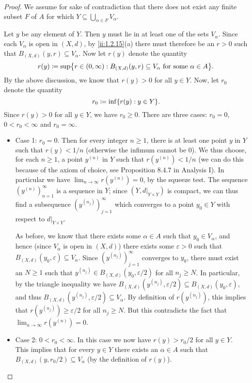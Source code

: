 \begin{proof}
  We assume for sake of contradiction that there does not exist any finite subset \(F\) of \(A\) for which \(Y \subseteq \bigcup_{\alpha \in F} V_{\alpha}\).

  Let \(y\) be any element of \(Y\).
  Then \(y\) must lie in at least one of the sets \(V_{\alpha}\).
  Since each \(V_{\alpha}\) is open in \((X, d)\), by \cref{ii:1.2.15}(a) there must therefore be an \(r > 0\) such that \(B_{(X, d)}(y, r) \subseteq V_{\alpha}\).
  Now let \(r(y)\) denote the quantity
  \[
    r(y) \coloneqq \sup\set{r \in (0, \infty) : B_{(X, d)}(y, r) \subseteq V_{\alpha} \text{ for some } \alpha \in A}.
  \]
  By the above discussion, we know that \(r(y) > 0\) for all \(y \in Y\).
  Now, let \(r_0\) denote the quantity
  \[
    r_0 \coloneqq \inf\set{r(y) : y \in Y}.
  \]
  Since \(r(y) > 0\) for all \(y \in Y\), we have \(r_0 \geq 0\).
  There are three cases: \(r_0 = 0\), \(0 < r_0 < \infty\) and \(r_0 = \infty\).
  \begin{itemize}
    \item Case 1:
          \(r_0 = 0\).
          Then for every integer \(n \geq 1\), there is at least one point \(y\) in \(Y\) such that \(r(y) < 1 / n\) (otherwise the infimum cannot be \(0\)).
          We thus choose, for each \(n \geq 1\), a point \(y^{(n)}\) in \(Y\) such that \(r(y^{(n)}) < 1 / n\)
          (we can do this because of the axiom of choice, see Proposition 8.4.7 in Analysis I).
          In particular we have \(\lim_{n \to \infty} r(y^{(n)}) = 0\), by the squeeze test.
          The sequence \((y^{(n)})_{n = 1}^\infty\) is a sequence in \(Y\);
          since \((Y, d|_{Y \times Y})\) is compact, we can thus find a subsequence \((y^{(n_j)})_{j = 1}^\infty\) which converges to a point \(y_0 \in Y\) with respect to \(d|_{Y \times Y}\).

          As before, we know that there exists some \(\alpha \in A\) such that \(y_0 \in V_{\alpha}\), and hence (since \(V_{\alpha}\) is open in \((X, d)\)) there exists some \(\varepsilon > 0\) such that \(B_{(X, d)}(y_0, \varepsilon) \subseteq V_{\alpha}\).
          Since \((y^{(n_j)})_{j = 1}^\infty\) converges to \(y_0\), there must exist an \(N \geq 1\) such that \(y^{(n_j)} \in B_{(X, d)}(y_0, \varepsilon / 2)\) for all \(n_j \geq N\).
          In particular, by the triangle inequality we have \(B_{(X, d)}(y^{(n_j)}, \varepsilon / 2) \subseteq B_{(X, d)}(y_0, \varepsilon)\), and thus \(B_{(X, d)}(y^{(n_j)}, \varepsilon / 2) \subseteq V_{\alpha}\).
          By definition of \(r(y^{(n_j)})\), this implies that \(r(y^{(n_j)}) \geq \varepsilon / 2\) for all \(n_j \geq N\).
          But this contradicts the fact that \(\lim_{n \to \infty} r(y^{(n)}) = 0\).
    \item Case 2:
          \(0 < r_0 < \infty\).
          In this case we now have \(r(y) > r_0 / 2\) for all \(y \in Y\).
          This implies that for every \(y \in Y\) there exists an \(\alpha \in A\) such that \(B_{(X, d)}(y, r_0 / 2) \subseteq V_{\alpha}\) (by the definition of \(r(y)\)).


\end{itemize}
\end{proof}
